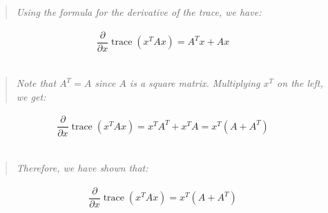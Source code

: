 \documentclass[a4paper]{article}
\begin{document}
\begin{itemize}
        \begin{quote}
            \emph{Using the formula for the derivative of the trace, we have:}
        \end{quote}
        
        \begin{align*}
            \dfrac{\partial}{\partial x} \operatorname{trace}(x^{T}Ax) = A^{T}x + Ax
        \end{align*}\\
        
        \begin{quote}
            \emph{Note that $A^{T} = A$ since $A$ is a square matrix. Multiplying $x^{T}$ on the left, we get:}
        \end{quote}
        
        \begin{align*}
            \dfrac{\partial}{\partial x} \operatorname{trace}(x^{T}Ax) = x^{T}A^{T} + x^{T}A = x^{T}(A + A^{T})
        \end{align*}\\
        
        \begin{quote}
            \emph{Therefore, we have shown that:}
        \end{quote}
        
        \begin{align*}
            \dfrac{\partial}{\partial x} \operatorname{trace}(x^{T}Ax) = x^{T}(A + A^{T})
        \end{align*}\\
        \end{itemize}
\end{document}

